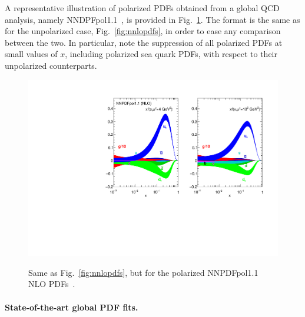 A representative illustration of polarized PDFs obtained from a global
QCD analysis, namely NNDPFpol1.1~\cite{Nocera:2014gqa}, is provided in Fig.~\ref{fig:qPDFpol}.
%
The format is the same as for the unpolarized case, Fig.~\ref{fig:nnlopdfs},
in order to ease any comparison between the two.
%
In particular, note the suppression of all polarized PDFs at small values of 
$x$, including polarized sea quark PDFs, with respect to their unpolarized 
counterparts.

\begin{figure}[!t]
\centering
\includegraphics[scale=0.8]{plots/NNPDFpol11}\\
\caption{\small Same as Fig.~\ref{fig:nnlopdfs}, 
but for the polarized NNPDFpol1.1 NLO PDFs~\cite{Nocera:2014gqa}.}
\label{fig:qPDFpol}
\end{figure}

\paragraph{State-of-the-art global PDF fits.}

